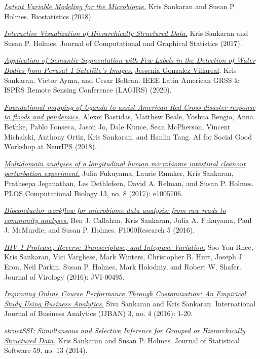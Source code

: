 \documentclass[letterpaper]{article}
\renewenvironment{itemize}{
  \begin{list}{}{
    \setlength{\leftmargin}{1.5em}
  }
}{
  \end{list}
}
\begin{document}
\begin{itemize}
  \item \href{https://doi.org/10.1093/biostatistics/kxy018}{\textit{Latent Variable Modeling for the Microbiome.}} Kris Sankaran and Susan P. Holmes. Biostatistics (2018).  
  \item \href{https://doi.org/10.1080/10618600.2017.1392866}{\textit{Interactive Visualization of Hierarchically Structured Data.}} Kris Sankaran and Susan P. Holmes. Journal of Computational and Graphical Statistics (2017).  
  \item \href{https://ieeexplore.ieee.org/document/9165643/}{\textit{Application of Semantic Segmentation with Few Labels in the Detection of Water Bodies from Perusat-1 Satellite's Images.}} \underline{Jessenia Gonzalez Villareal}, Kris Sankaran, Victor Ayma, and Cesar Beltran. IEEE Latin American GRSS \& ISPRS Remote Sensing Conference (LAGIRS) (2020).  
  \item \href{https://aiforsocialgood.github.io/2018/pdfs/track2/81_aisg_neurips2018.pdf}{\textit{Foundational mapping of Uganda to assist American Red Cross disaster response to floods and pandemics.}} Alexei Bastidas, Matthew Beale, Yoshua Bengio, Anna Bethke, Pablo Fonseca, Jason Jo, Dale Kunce, Sean McPherson, Vincent Michalski, Anthony Ortiz, Kris Sankaran, and Hanlin Tang. AI for Social Good Workshop at NeurIPS (2018).  
  \item \href{https://doi.org/10.1371/journal.pcbi.1005706 }{\textit{Multidomain analyses of a longitudinal human microbiome intestinal cleanout perturbation experiment.}} Julia Fukuyama, Laurie Rumker, Kris Sankaran, Pratheepa Jeganathan, Les Dethlefsen, David A. Relman, and Susan P. Holmes. PLOS Computational Biology 13, no. 8 (2017): e1005706.  
  \item \href{https://doi.org/10.12688/f1000research.8986.2}{\textit{Bioconductor workflow for microbiome data analysis: from raw reads to community analyses.}} Ben J. Callahan, Kris Sankaran, Julia A. Fukuyama, Paul J. McMurdie, and Susan P. Holmes. F1000Research 5 (2016).  
  \item \href{https://doi.org/10.1128/jvi.00495-16}{\textit{HIV-1 Protease, Reverse Transcriptase, and Integrase Variation.}} Soo-Yon Rhee, Kris Sankaran, Vici Varghese, Mark Winters, Christopher B. Hurt, Joseph J. Eron, Neil Parkin, Susan P. Holmes, Mark Holodniy, and Robert W. Shafer. Journal of Virology (2016): JVI-00495.  
  \item \href{https://www.igi-global.com/chapter/improving-online-course-performance-through-customization/183535}{\textit{Improving Online Course Performance Through Customization: An Empirical Study Using Business Analytics.}} Siva Sankaran and Kris Sankaran. International Journal of Business Analytics (IJBAN) 3, no. 4 (2016): 1-20.  
  \item \href{https://doi.org/10.18637/jss.v059.i13}{\textit{structSSI: Simultaneous and Selective Inference for Grouped or Hierarchically Structured Data.}} Kris Sankaran and Susan P. Holmes. Journal of Statistical Software 59, no. 13 (2014).  
\end{itemize}
\end{document}
